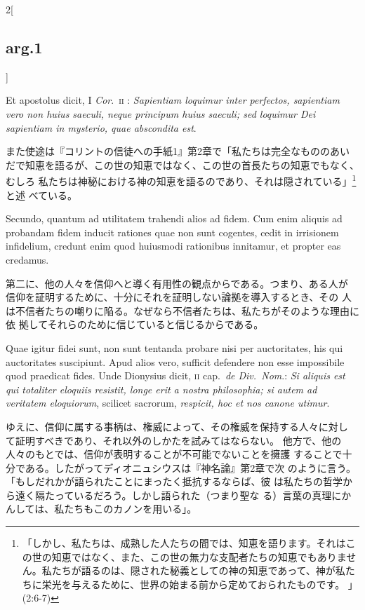 \documentclass[paper=a4paper,fontsize=10pt,jafontsize=9pt,titlepage]{jlreq}
\begin{document}
\begin{paracol}{2}[\subsection{arg.1}]
\switchcolumn*

Et apostolus dicit, I {\itshape Cor}.~{\scshape ii} : {\itshape Sapientiam loquimur inter perfectos,
sapientiam vero non huius saeculi, neque principum huius saeculi; sed
loquimur Dei sapientiam in mysterio, quae abscondita est}.

\switchcolumn

また使途は『コリントの信徒への手紙1』第2章で「私たちは完全なもののあい
 だで知恵を語るが、この世の知恵ではなく、この世の首長たちの知恵でもなく、むしろ
 私たちは神秘における神の知恵を語るのであり、それは隠されている」\footnote{「しかし、私たちは、成熟した人たちの間では、知恵を語ります。それはこの世の知恵ではなく、また、この世の無力な支配者たちの知恵でもありません。私たちが語るのは、隠された秘義としての神の知恵であって、神が私たちに栄光を与えるために、世界の始まる前から定めておられたものです。 」(2:6-7)}と述
 べている。

\switchcolumn*

Secundo,
quantum ad utilitatem trahendi alios ad fidem. Cum enim aliquis ad
probandam fidem inducit rationes quae non sunt cogentes, cedit in
irrisionem infidelium, credunt enim quod huiusmodi rationibus
innitamur, et propter eas credamus.

\switchcolumn

第二に、他の人々を信仰へと導く有用性の観点からである。つまり、ある人が
 信仰を証明するために、十分にそれを証明しない論拠を導入するとき、その
 人は不信者たちの嘲りに陥る。なぜなら不信者たちは、私たちがそのような理由に依
 拠してそれらのために信じていると信じるからである。

\switchcolumn*

Quae igitur fidei sunt, non sunt
tentanda probare nisi per auctoritates, his qui auctoritates
suscipiunt. Apud alios vero, sufficit defendere non esse impossibile
quod praedicat fides. Unde Dionysius dicit, {\scshape ii} cap.~{\itshape de Div.~Nom}.: {\itshape Si
aliquis est qui totaliter eloquiis resistit, longe erit a nostra
philosophia; si autem ad veritatem eloquiorum}, scilicet sacrorum,
{\itshape respicit, hoc et nos canone utimur}.

\switchcolumn

ゆえに、信仰に属する事柄は、権威によって、その権威を保持する人々に対し
 て証明すべきであり、それ以外のしかたを試みてはならない。
他方で、他の人々のもとでは、信仰が表明することが不可能でないことを擁護
 することで十分である。したがってディオニュシウスは『神名論』第2章で次
 のように言う。「もしだれかが語られたことにまったく抵抗するならば、彼
 は私たちの哲学から遠く隔たっているだろう。しかし語られた（つまり聖な
 る）言葉の真理にかんしては、私たちもこのカノンを用いる」。


\end{paracol}
\end{document}
